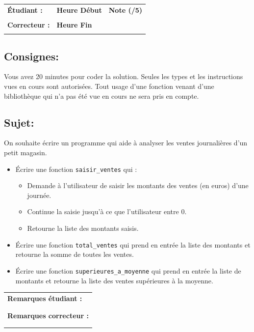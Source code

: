 \documentclass[a4paper,11pt]{article}
\begin{document}
\begin{table}[h!]
\centering
\renewcommand{\arraystretch}{1.4} %
\begin{tabular}{|p{10cm}|p{3cm}|p{2cm}|}
\hline
\textbf{Étudiant :} & \textbf{Heure Début }  & \textbf{Note (/5) }  \\
& & \\
\hline
\textbf{Correcteur :} & \textbf{Heure Fin } & \\
& & \\
\hline

\hline
\end{tabular}
\end{table}

\subsection*{Consignes:} Vous avez 20 minutes pour coder la solution. Seules les types et les instructions vues en cours sont autorisées. Tout usage d'une fonction 
venant d'une bibliothèque qui n'a pas été vue en cours ne sera pris en compte. 


\subsection*{Sujet:}

On souhaite écrire un programme qui aide à analyser les ventes journalières d’un petit magasin.

\begin{itemize}
\item[1.] Écrire une fonction \texttt{saisir\_ventes} qui :
\begin{itemize}
\item Demande à l’utilisateur de saisir les montants des ventes (en euros) d’une journée.
\item Continue la saisie jusqu’à ce que l’utilisateur entre 0.
\item Retourne la liste des montants saisis.
\end{itemize}
\item[2.]  \'Ecrire une fonction \texttt{total\_ventes} qui  prend en entrée la liste des montants et retourne la somme de toutes les ventes. 
\item[3.] \'Ecrire une fonction \texttt{superieures\_a\_moyenne} qui prend en entrée la liste de montants et  retourne la liste des ventes supérieures à la moyenne. 
\end{itemize}

\vspace*{0.2 cm}
\begin{table}[h!]
\centering
\renewcommand{\arraystretch}{1.4} %
\begin{tabular}{|p{15cm}|}
\hline
\textbf{Remarques étudiant :}    \\
 \\
 \\
\hline
\textbf{Remarques correcteur :}  \\
 \\
 \\
\hline
\end{tabular}
\end{table}
\end{document}

